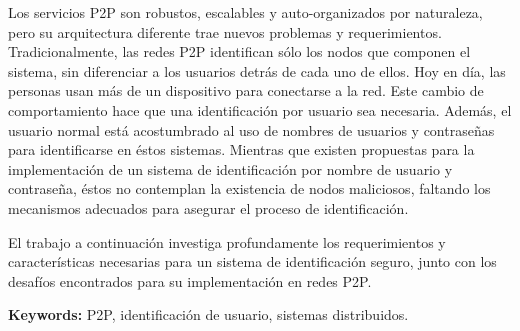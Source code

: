 Los servicios P2P son robustos, escalables y auto-organizados por naturaleza,
pero su arquitectura diferente trae nuevos problemas y requerimientos.
Tradicionalmente, las redes P2P identifican sólo los nodos que componen el
sistema, sin diferenciar a los usuarios detrás de cada uno de ellos.
Hoy en día, las personas usan más de un dispositivo para conectarse a la red.
Este cambio de comportamiento hace que una identificación por usuario sea
necesaria. Además, el usuario normal está acostumbrado al uso de nombres de
usuarios y contraseñas para identificarse en éstos sistemas.
Mientras que existen propuestas para la implementación de un sistema de
identificación por nombre de usuario y contraseña, éstos no contemplan la
existencia de nodos maliciosos, faltando los mecanismos adecuados para
asegurar el proceso de identificación.

El trabajo a continuación investiga profundamente los requerimientos y
características necesarias para un sistema de identificación seguro, junto con
los desafíos encontrados para su implementación en redes P2P.


%

{\bf Keywords:} P2P, identificación de usuario, sistemas distribuidos.
